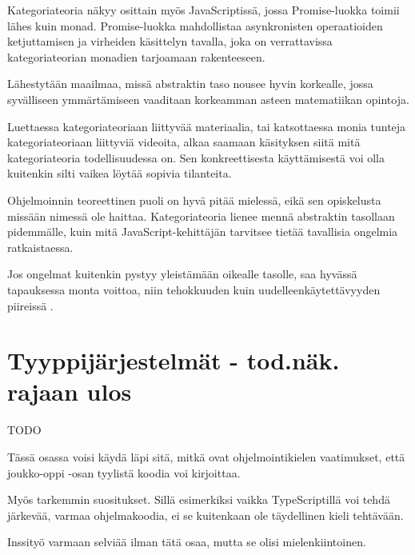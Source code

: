 Kategoriateoria näkyy osittain myös JavaScriptissä, jossa Promise-luokka toimii lähes kuin \gls{monad}. Promise-luokka mahdollistaa asynkronisten operaatioiden ketjuttamisen ja virheiden käsittelyn tavalla, joka on verrattavissa kategoriateorian monadien tarjoamaan rakenteeseen. \citep{promises-spec-94}


Lähestytään maailmaa, missä abstraktin taso nousee hyvin korkealle, jossa syvälliseen ymmärtämiseen vaaditaan korkeamman asteen matematiikan opintoja.

Luettaessa kategoriateoriaan liittyvää materiaalia, tai katsottaessa monia tunteja kategoriateoriaan liittyviä videoita, alkaa saamaan käsityksen siitä mitä kategoriateoria todellisuudessa on. Sen konkreettisesta käyttämisestä voi olla kuitenkin silti vaikea löytää sopivia tilanteita.

Ohjelmoinnin teoreettinen puoli on hyvä pitää mielessä, eikä sen opiskelusta missään nimessä ole haittaa. Kategoriateoria lienee mennä abstraktin tasollaan pidemmälle, kuin mitä JavaScript-kehittäjän tarvitsee tietää tavallisia ongelmia ratkaistaessa.

Jos ongelmat kuitenkin pystyy yleistämään oikealle tasolle, saa hyvässä tapauksessa monta voittoa, niin tehokkuuden kuin uudelleenkäytettävyyden piireissä \cite{clojure_compiler,bartosz_category_for_progamers}.


\section{Tyyppijärjestelmät - tod.näk. rajaan ulos}

TODO

Tässä osassa voisi käydä läpi sitä, mitkä ovat ohjelmointikielen vaatimukset, että joukko-oppi -osan tyylistä koodia voi kirjoittaa.

Myös tarkemmin suositukset. Sillä esimerkiksi vaikka TypeScriptillä voi tehdä järkevää, varmaa ohjelmakoodia, ei se kuitenkaan ole täydellinen kieli tehtävään.

Inssityö varmaan selviää ilman tätä osaa, mutta se olisi mielenkiintoinen.



